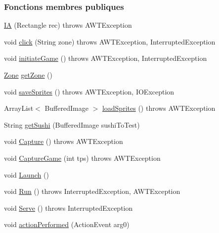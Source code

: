 \subsubsection*{Fonctions membres publiques}
\begin{DoxyCompactItemize}
\item 
\hyperlink{classSushis_1_1src_1_1IA_ae09b1ae66dfec966050bde22afebf409}{I\+A} (Rectangle rec)  throws A\+W\+T\+Exception 
\item 
void \hyperlink{classSushis_1_1src_1_1IA_a6cfc37df4fd2a02cf6b75abb3f3bdfc6}{click} (String zone)  throws A\+W\+T\+Exception, Interrupted\+Exception 
\item 
void \hyperlink{classSushis_1_1src_1_1IA_ad4ad87f8107d1c7f5cf520ac1322e1f4}{initiate\+Game} ()  throws A\+W\+T\+Exception, Interrupted\+Exception 
\item 
\hyperlink{classSushis_1_1src_1_1Zone}{Zone} \hyperlink{classSushis_1_1src_1_1IA_a93671a60ef14f7bc5ab5ad1cad0066a9}{get\+Zone} ()
\item 
void \hyperlink{classSushis_1_1src_1_1IA_ab80d7759fd410f391118e5fea2fb4c30}{save\+Sprites} ()  throws A\+W\+T\+Exception, I\+O\+Exception 
\item 
Array\+List$<$ Buffered\+Image $>$ \hyperlink{classSushis_1_1src_1_1IA_a17ae4bc6c3a8949a667a893a24413d19}{load\+Sprites} ()  throws A\+W\+T\+Exception 
\item 
String \hyperlink{classSushis_1_1src_1_1IA_aeeb6af348f605d72fa13038d47fe8bbb}{get\+Sushi} (Buffered\+Image sushi\+To\+Test)
\item 
void \hyperlink{classSushis_1_1src_1_1ToolBox_ade4282ccb35c18dd7cd473c680145b86}{Capture} ()  throws A\+W\+T\+Exception 
\item 
void \hyperlink{classSushis_1_1src_1_1ToolBox_a85ac3d5ce3aa8a7a3691f6dbbc000aed}{Capture\+Game} (int tps)  throws A\+W\+T\+Exception 
\item 
void \hyperlink{classSushis_1_1src_1_1ToolBox_afac5ed37e5905a6409a375e5ad2000b2}{Launch} ()
\item 
void \hyperlink{classSushis_1_1src_1_1ToolBox_a2542efab6381677391dfe6407c0db0f7}{Run} ()  throws Interrupted\+Exception, A\+W\+T\+Exception 
\item 
void \hyperlink{classSushis_1_1src_1_1ToolBox_adad53308af901ed75c8ddd16e7069e6d}{Serve} ()  throws Interrupted\+Exception 
\item 
void \hyperlink{classSushis_1_1src_1_1ToolBox_a5c3c1e9751ac4cd49965024ae0485e56}{action\+Performed} (Action\+Event arg0)
\end{DoxyCompactItemize}
